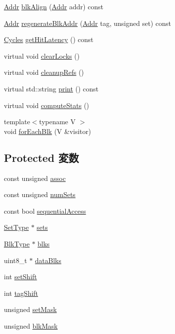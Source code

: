 \begin{DoxyCompactItemize}
\item 
\hyperlink{base_2types_8hh_af1bb03d6a4ee096394a6749f0a169232}{Addr} \hyperlink{classLRU_a73119e914b3b83f88be5bde312855cfe}{blkAlign} (\hyperlink{base_2types_8hh_af1bb03d6a4ee096394a6749f0a169232}{Addr} addr) const 
\item 
\hyperlink{base_2types_8hh_af1bb03d6a4ee096394a6749f0a169232}{Addr} \hyperlink{classLRU_a33c16949fb3c73efb61bca4c90195b7d}{regenerateBlkAddr} (\hyperlink{base_2types_8hh_af1bb03d6a4ee096394a6749f0a169232}{Addr} tag, unsigned set) const 
\item 
\hyperlink{classCycles}{Cycles} \hyperlink{classLRU_a0239f3ef0ba6cf7c0460b12d289e6517}{getHitLatency} () const 
\item 
virtual void \hyperlink{classLRU_a522e7dda9c2f4eba2cc1c103887d9265}{clearLocks} ()
\item 
virtual void \hyperlink{classLRU_a1acd4c03e94e57919f1254cc4fa0b059}{cleanupRefs} ()
\item 
virtual std::string \hyperlink{classLRU_ae8a5b5e9e0e6be3b115ee77fa7b4d0c8}{print} () const 
\item 
virtual void \hyperlink{classLRU_a7dd045727ced6181c74934442e2ca33d}{computeStats} ()
\item 
{\footnotesize template$<$typename V $>$ }\\void \hyperlink{classLRU_a2f6fd1256bf2c210092c065ea65b83de}{forEachBlk} (V \&visitor)
\end{DoxyCompactItemize}
\subsection*{Protected 変数}
\begin{DoxyCompactItemize}
\item 
const unsigned \hyperlink{classLRU_accc9cc9a48a59881735c6aab4afc3ceb}{assoc}
\item 
const unsigned \hyperlink{classLRU_a5fd82580355559fd0c858de6292f3bb7}{numSets}
\item 
const bool \hyperlink{classLRU_abcad7d1df4609a3182779b57fc4120ac}{sequentialAccess}
\item 
\hyperlink{classCacheSet}{SetType} $\ast$ \hyperlink{classLRU_af644b16f4706597c8192621b8c58e2ed}{sets}
\item 
\hyperlink{classCacheBlk}{BlkType} $\ast$ \hyperlink{classLRU_adf78a0a96f176dd1b76d59906eda0c7d}{blks}
\item 
uint8\_\-t $\ast$ \hyperlink{classLRU_aec49d2d4de051250b86595f2ac472d42}{dataBlks}
\item 
int \hyperlink{classLRU_a836015c10ab05e1e7c4be79579a50730}{setShift}
\item 
int \hyperlink{classLRU_a782a405572109567b3a79ac934e91632}{tagShift}
\item 
unsigned \hyperlink{classLRU_aaac2f20338ad5e01ac8e2354606777ea}{setMask}
\item 
unsigned \hyperlink{classLRU_a7dcd7050ee7dfacdc9057287efbe3aa6}{blkMask}
\end{DoxyCompactItemize}


